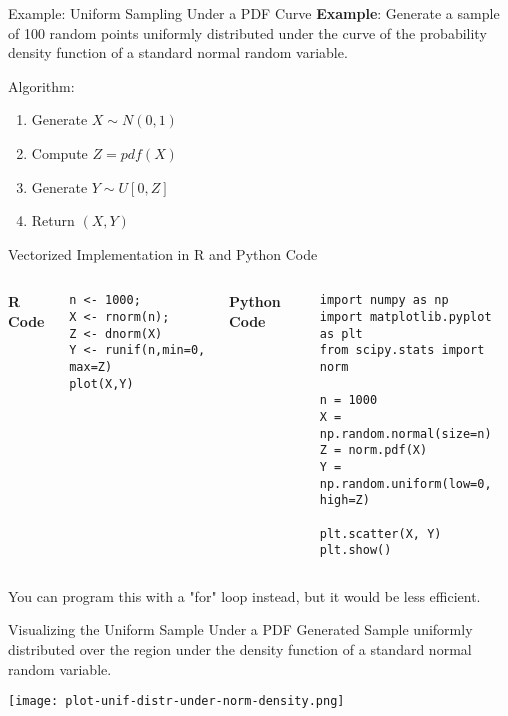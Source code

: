 \documentclass[8pt]{beamer}
\begin{document}
\begin{frame}{Example: Uniform Sampling Under a PDF Curve}
\textbf{Example}: Generate a sample of 100 random points uniformly distributed under the curve of the probability density function of a standard normal random variable.

\vspace{2mm}

\alert{Algorithm}:

\begin{enumerate}
\item Generate $X \sim N(0,1)$
\item Compute $Z=pdf(X)$
\item Generate $Y \sim U[0, Z]$
\item Return $(X,Y)$
\end{enumerate}
\end{frame}

\begin{frame}[fragile]{Vectorized Implementation in R and Python}
\alert{Code}

\begin{columns}
\textbf{R Code}

\begin{lstlisting}
n <- 1000;
X <- rnorm(n);
Z <- dnorm(X)
Y <- runif(n,min=0, max=Z)
plot(X,Y)
\end{lstlisting}

\textbf{Python Code}

\begin{lstlisting}
import numpy as np
import matplotlib.pyplot as plt
from scipy.stats import norm

n = 1000
X = np.random.normal(size=n)
Z = norm.pdf(X)
Y = np.random.uniform(low=0, high=Z)

plt.scatter(X, Y)
plt.show()
\end{lstlisting}
\end{columns}

\vspace{2mm}

You can program this with a "for" loop instead, but it would be less efficient.
\end{frame}


\begin{frame}{Visualizing the Uniform Sample Under a PDF}
Generated Sample uniformly distributed over the region under the density function of a standard normal random variable.

\begin{center}
\texttt{[image: plot-unif-distr-under-norm-density.png]}
\end{center}
\end{frame}
\end{document}
